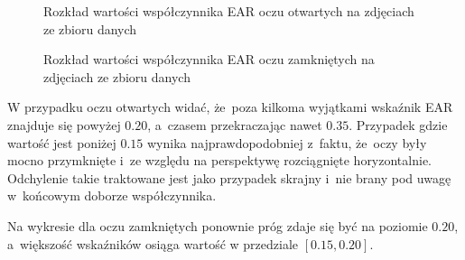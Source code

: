 \begin{figure}[!h]
    \centering
    \caption{Rozkład  wartości współczynnika EAR oczu otwartych na zdjęciach ze zbioru danych}
    \label{fig:ear_static_open}
\end{figure}

\begin{figure}[!h]
    \centering
    \caption{Rozkład  wartości współczynnika EAR oczu zamkniętych na zdjęciach ze zbioru danych}
    \label{fig:ear_static_close}
\end{figure}

W przypadku oczu otwartych widać, że~poza kilkoma wyjątkami wskaźnik EAR znajduje się powyżej $0.20$, a~czasem przekraczając nawet $0.35$. Przypadek gdzie wartość jest poniżej $0.15$ wynika najprawdopodobniej z~faktu, że~oczy były mocno przymknięte i~ze względu na perspektywę rozciągnięte horyzontalnie. Odchylenie takie traktowane jest jako przypadek skrajny i~nie brany pod uwagę w~końcowym doborze współczynnika.

\par

Na wykresie dla oczu zamkniętych ponownie próg zdaje się być na poziomie $0.20$, a~większość wskaźników osiąga wartość w przedziale $[0.15, 0.20]$. 



